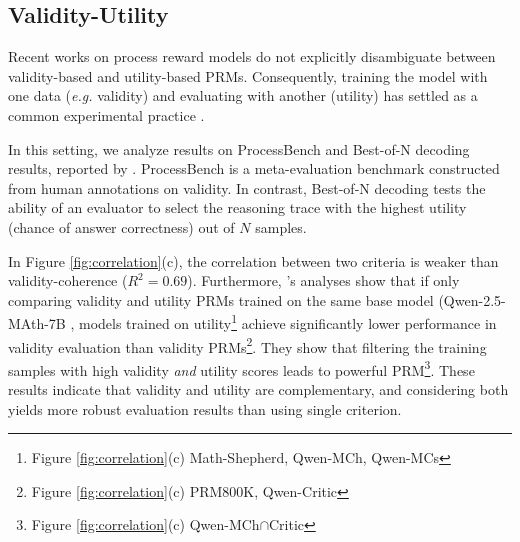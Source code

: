 \subsection{Validity-Utility}
\label{sec:transfer-vu}

Recent works on process reward models do not explicitly disambiguate between validity-based and utility-based PRMs. Consequently, training the model with one data (\textit{e.g.} validity) and evaluating with another (utility) has settled as a common experimental practice \citep{DBLP:conf/iclr/LightmanKBEBLLS24, ma2023letsrewardstepstep, zheng2024processbenchidentifyingprocesserrors, song2025prmbenchfinegrainedchallengingbenchmark}. %

In this setting, we analyze results on ProcessBench \citep{zheng2024processbenchidentifyingprocesserrors} and Best-of-N decoding results, reported by \citet{zhang2025lessonsdevelopingprocessreward}. ProcessBench is a meta-evaluation benchmark constructed from human annotations on validity. In contrast, Best-of-N decoding tests the ability of an evaluator to select the reasoning trace with the highest utility (chance of answer correctness) out of $N$ samples.

In Figure \ref{fig:correlation}(c), the correlation between two criteria is weaker than validity-coherence ($R^2=0.69$). Furthermore, \citet{zhang2025lessonsdevelopingprocessreward}'s analyses show that if only comparing validity and utility PRMs trained on the same base model (Qwen-2.5-MAth-7B \citep{yang2024qwen25mathtechnicalreportmathematical}, models trained on utility\footnote{Figure \ref{fig:correlation}(c) Math-Shepherd, Qwen-MCh, Qwen-MCs} achieve significantly lower performance in validity evaluation than validity PRMs\footnote{Figure \ref{fig:correlation}(c) PRM800K, Qwen-Critic}. They show that filtering the training samples with high validity \textit{and} utility scores leads to powerful PRM\footnote{Figure \ref{fig:correlation}(c) Qwen-MCh$\cap$Critic}. These results indicate that validity and utility are complementary, and considering both yields more robust evaluation results than using single criterion.